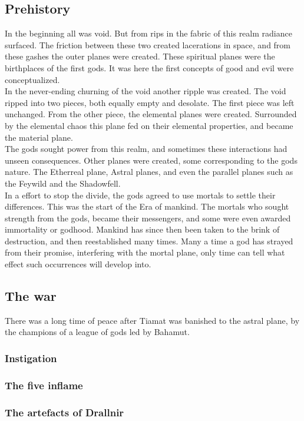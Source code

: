 \documentclass[a4paper]{book}
\begin{document}
\subsection{Prehistory}
In the beginning all was void. But from rips in the fabric of this realm radiance surfaced. The friction between these two created lacerations in space, and from these gashes the outer planes were created. These spiritual planes were the birthplaces of the first gods. It was here the first concepts of good and evil were conceptualized.\\
In the never-ending churning of the void another ripple was created. The void ripped into two pieces, both equally empty and desolate. The first piece was left unchanged. From the other piece, the elemental planes were created. Surrounded by the elemental chaos this plane fed on their elemental properties, and became the material plane.\\
The gods sought power from this realm, and sometimes these interactions had unseen consequences. Other planes were created, some corresponding to the gods nature. The Etherreal plane, Astral planes, and even the parallel planes such as the Feywild and the Shadowfell.\\
In a effort to stop the divide, the gods agreed to use mortals to settle their differences. This was the start of the Era of mankind. The mortals who sought strength from the gods, became their messengers, and some were even awarded immortality or godhood. Mankind has since then been taken to the brink of destruction, and then reestablished many times. Many a time a god has strayed from their promise, interfering with the mortal plane, only time can tell what effect such occurrences will develop into.

\subsection{The war}
There was a long time of peace after Tiamat was banished to the astral plane, by the champions of a league of gods led by Bahamut.
\subsubsection{Instigation}

\subsubsection{The five inflame}

\subsubsection{The artefacts of Drallnir}
\end{document}
